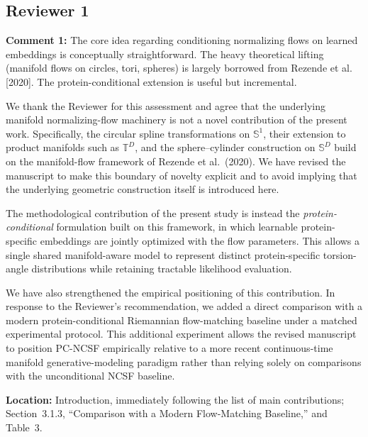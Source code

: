 \documentclass[a4paper,11pt]{article}
\newcommand{\reviewercomment}[2]{%
    \begin{reviewerscomment}
        \textbf{Comment #1:} #2
    \end{reviewerscomment}
}
\newcommand{\response}[1]{%
    \begin{myresponse}
        #1
    \end{myresponse}
    \vspace{5mm}
}
\begin{document}

\subsection*{Reviewer 1}



\reviewercomment{1}{
The core idea regarding conditioning normalizing flows on learned embeddings
is conceptually straightforward. The heavy theoretical lifting (manifold flows
on circles, tori, spheres) is largely borrowed from Rezende et al. [2020].
The protein-conditional extension is useful but incremental.
}

\response{
We thank the Reviewer for this assessment and agree that the underlying
manifold normalizing-flow machinery is not a novel contribution of the present
work. Specifically, the circular spline transformations on $\mathbb{S}^{1}$,
their extension to product manifolds such as $\mathbb{T}^{D}$, and the
sphere--cylinder construction on $\mathbb{S}^{D}$ build on the manifold-flow
framework of Rezende et al.~(2020). We have revised the manuscript to make this
boundary of novelty explicit and to avoid implying that the underlying
geometric construction itself is introduced here.

The methodological contribution of the present study is instead the
\emph{protein-conditional} formulation built on this framework, in which
learnable protein-specific embeddings are jointly optimized with the flow
parameters. This allows a single shared manifold-aware model to represent
distinct protein-specific torsion-angle distributions while retaining
tractable likelihood evaluation.

We have also strengthened the empirical positioning of this contribution.
In response to the Reviewer's recommendation, we added a direct comparison
with a modern protein-conditional Riemannian flow-matching baseline under a
matched experimental protocol. This additional experiment allows the revised
manuscript to position PC-NCSF empirically relative to a more recent
continuous-time manifold generative-modeling paradigm rather than relying
solely on comparisons with the unconditional NCSF baseline.

\textbf{Location:} Introduction, immediately following the list of main
contributions; Section~3.1.3, ``Comparison with a Modern Flow-Matching
Baseline,'' and Table~3.
}
\end{document}
